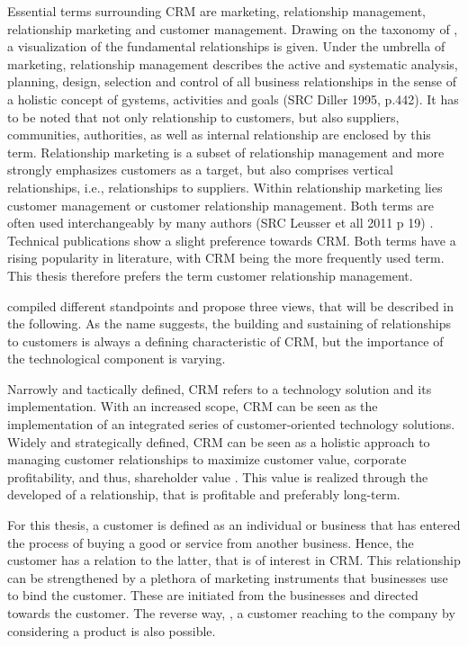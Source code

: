 		Essential terms surrounding CRM are marketing, relationship management, relationship marketing and customer management. Drawing on the taxonomy of \cite{hippnerwilde2011}, a visualization of the fundamental relationships is given. Under the umbrella of marketing, relationship management describes the active and systematic analysis, planning, design, selection and control of all business relationships in the sense of a holistic concept of gystems, activities and goals (SRC Diller 1995, p.442). It has to be noted that not only relationship to customers, but also suppliers, communities, authorities, as well as internal relationship are enclosed by this term. Relationship marketing is a subset of relationship management and more strongly emphasizes customers as a target, but also comprises vertical relationships, i.e., relationships to suppliers. Within relationship marketing lies customer management or customer relationship management. Both terms are often used interchangeably by many authors (SRC Leusser et all 2011 p 19) \cite{ryals2001customer}. Technical publications show a slight preference towards CRM. Both terms have a rising popularity in literature, with CRM being the more frequently used term. This thesis therefore prefers the term customer relationship management. 
		
		\cite{paynefrow2005} compiled different standpoints and propose three views, that will be described in the following. As the name suggests, the building and sustaining of relationships to customers is always a defining characteristic of \acrshort{CRM}, but the importance of the technological component is varying. 
		
		Narrowly and tactically defined, \acrshort{CRM} refers to a technology solution and its implementation. With an increased scope, \acrshort{CRM} can be seen as the implementation of an integrated series of customer-oriented technology solutions. Widely and strategically defined, \acrshort{CRM} can be seen as a holistic approach to managing customer relationships to maximize customer value, corporate profitability, and thus, shareholder value \cite{payne2004role}. This value is realized through the developed of a relationship, that is profitable and preferably long-term. 
	
		For this thesis, a customer is defined as an individual or business that has entered the process of buying a good or service from another business. Hence, the customer has a relation to the latter, that is of interest in CRM. This relationship can be strengthened by a plethora of marketing instruments that businesses use to bind the customer. These are initiated from the businesses and directed towards the customer. The reverse way, \ie, a customer reaching to the company by considering a product is also possible.  
		
